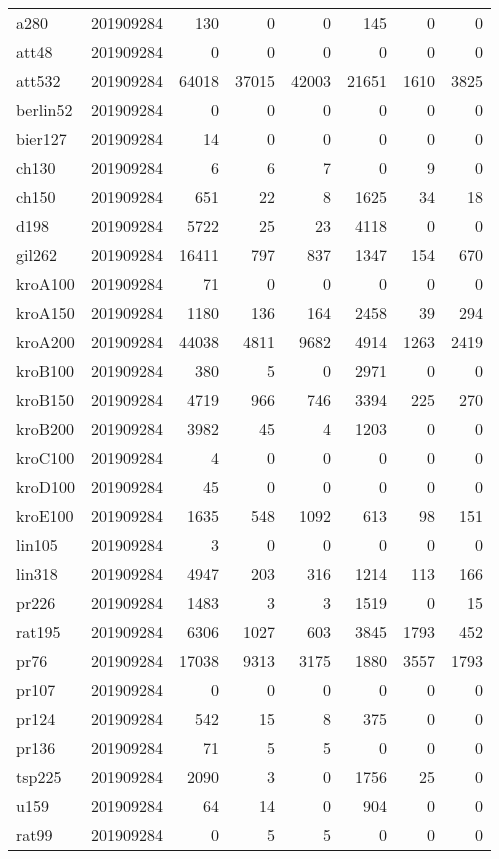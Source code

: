 \begin{center}
\begin{longtable}{llrrrrrr}
a280 & 201909284 & 130 & 0 & 0 & 145 & 0 & 0 \\
att48 & 201909284 & 0 & 0 & 0 & 0 & 0 & 0\\
att532 & 201909284 & 64018 & 37015 & 42003 & 21651 & 1610 & 3825\\
berlin52 & 201909284 & 0 & 0 & 0 & 0 & 0 & 0\\
bier127 & 201909284 & 14 & 0 & 0 & 0 & 0 & 0\\
ch130 & 201909284 & 6 & 6 & 7 & 0 & 9 & 0\\
ch150 & 201909284 & 651 & 22 & 8 & 1625 & 34 & 18\\
d198 & 201909284 & 5722 & 25 & 23 & 4118 & 0 & 0\\
gil262 & 201909284 & 16411 & 797 & 837 & 1347 & 154 & 670\\
kroA100 & 201909284 & 71 & 0 & 0 & 0 & 0 & 0\\
kroA150 & 201909284 & 1180 & 136 & 164 & 2458 & 39 & 294\\
kroA200 & 201909284 & 44038 & 4811 & 9682 & 4914 & 1263 & 2419\\
kroB100 & 201909284 & 380 & 5 & 0 & 2971 & 0 & 0\\
kroB150 & 201909284 & 4719 & 966 & 746 & 3394 & 225 & 270\\
kroB200 & 201909284 & 3982 & 45 & 4 & 1203 & 0 & 0\\
kroC100 & 201909284 & 4 & 0 & 0 & 0 & 0 & 0\\
kroD100 & 201909284 & 45 & 0 & 0 & 0 & 0 & 0\\
kroE100 & 201909284 & 1635 & 548 & 1092 & 613 & 98 & 151\\
lin105 & 201909284 & 3 & 0 & 0 & 0 & 0 & 0\\
lin318 & 201909284 & 4947 & 203 & 316 & 1214 & 113 & 166\\
pr226 & 201909284 & 1483 & 3 & 3 & 1519 & 0 & 15\\
rat195 & 201909284 & 6306 & 1027 & 603 & 3845 & 1793 & 452\\
pr76 & 201909284 & 17038 & 9313 & 3175 & 1880 & 3557 & 1793\\
pr107 & 201909284 & 0 & 0 & 0 & 0 & 0 & 0\\
pr124 & 201909284 & 542 & 15 & 8 & 375 & 0 & 0\\
pr136 & 201909284 & 71 & 5 & 5 & 0 & 0 & 0\\
tsp225 & 201909284 & 2090 & 3 & 0 & 1756 & 25 & 0\\
u159  & 201909284 & 64 & 14 & 0 & 904 & 0 & 0\\
rat99 & 201909284 & 0 & 5 & 5 & 0 & 0 & 0\\

\end{longtable}
\end{center}
